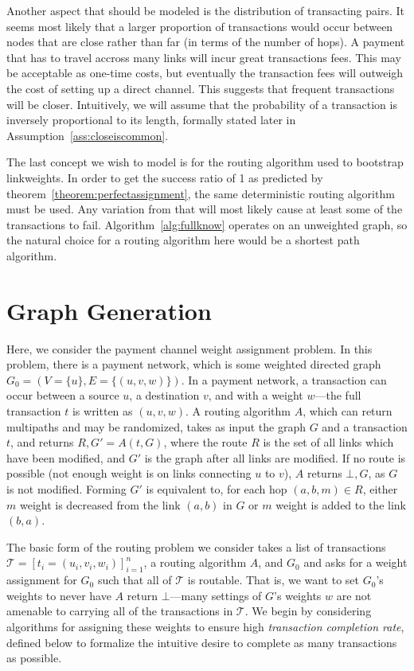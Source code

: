 \documentclass{article}
\theoremstyle{definition}
\begin{document}
Another aspect that should be modeled is the distribution of transacting pairs. It seems most likely that a larger proportion of transactions would occur between nodes that are close rather than far (in terms of the number of hops). A payment that has to travel accross many links will incur great transactions fees. This may be acceptable as one-time costs, but eventually the transaction fees will outweigh the cost of setting up a direct channel. This suggests that frequent transactions will be closer. Intuitively, we will assume that the probability of a transaction is inversely proportional to its length, formally stated later in Assumption~\ref{ass:closeiscommon}.

The last concept we wish to model is for the routing algorithm used to bootstrap linkweights. In order to get the success ratio of 1 as predicted by theorem~\ref{theorem:perfectassignment}, the same deterministic routing algorithm must be used. Any variation from that will most likely cause at least some of the transactions to fail. Algorithm~\ref{alg:fullknow} operates on an unweighted graph, so the natural choice for a routing algorithm here would be a shortest path algorithm.

\section{Graph Generation}
Here, we consider the payment channel weight assignment problem. In this problem, there is a payment network, which is some weighted directed graph $G_0=(V=\lbrace u\rbrace, E=\lbrace (u, v, w)\rbrace)$. In a payment network, a transaction can occur between a source $u$, a destination $v$, and with a weight $w$---the full transaction $t$ is written as $(u,v,w)$. A routing algorithm $A$, which can return multipaths and may be randomized, takes as input the graph $G$ and a transaction $t$, and returns $R, G'=A(t,G)$, where the route $R$ is the set of all links which have been modified, and $G'$ is the graph after all links are modified. If no route is possible (not enough weight is on links connecting $u$ to $v$), $A$ returns $\bot, G$, as $G$ is not modified. Forming $G'$ is equivalent to, for each hop $(a, b, m)\in R$, either $m$ weight is decreased from the link $(a,b)$ in $G$ or $m$ weight is added to the link $(b,a)$.

The basic form of the routing problem we consider takes a list of transactions $\mathcal{T} = [t_i=(u_i,v_i,w_i)]_{i=1}^n$, a routing algorithm $A$, and $G_0$ and asks for a weight assignment for $G_0$ such that all of $\mathcal{T}$ is routable. That is, we want to set $G_0$'s weights to never have $A$ return $\bot$---many settings of $G$'s weights $w$ are not amenable to carrying all of the transactions in $\mathcal{T}$. We begin by considering algorithms for assigning these weights to ensure high \emph{transaction completion rate}, defined below to formalize the intuitive desire to complete as many transactions as possible.
\end{document}
